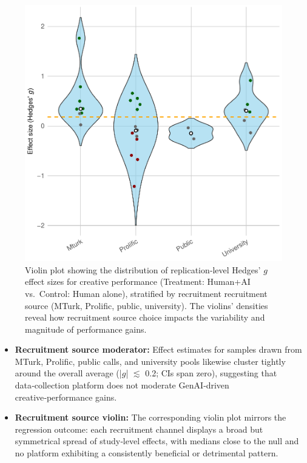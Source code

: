 \documentclass[manuscript, screen, review, acmsmall, anonymous]{acmart}
\begin{document}
\begin{figure}[H]
  \centering
  \includegraphics[width=\linewidth]{plot_performance_raw_violin_Recruitment_Source}
  \caption{Violin plot showing the distribution of replication‑level Hedges’ $g$ effect sizes for creative performance (Treatment: Human+AI vs.\ Control: Human alone), stratified by recruitment recruitment source (MTurk, Prolific, public, university). The violins’ densities reveal how recruitment source choice impacts the variability and magnitude of performance gains.}
  \label{fig:performance_raw_violin_Recruitment_Source}
\end{figure}
\begin{itemize}
  \item \textbf{Recruitment source moderator:} Effect estimates for samples drawn from MTurk, Prolific, public calls, and university pools likewise cluster tightly around the overall average (|$g$| $\lesssim$ 0.2; CIs span zero), suggesting that data‑collection platform does not moderate GenAI‑driven creative‑performance gains.
  \item \textbf{Recruitment source violin:} The corresponding violin plot mirrors the regression outcome: each recruitment channel displays a broad but symmetrical spread of study‑level effects, with medians close to the null and no platform exhibiting a consistently beneficial or detrimental pattern.
\end{itemize}
\newpage
\end{document}
